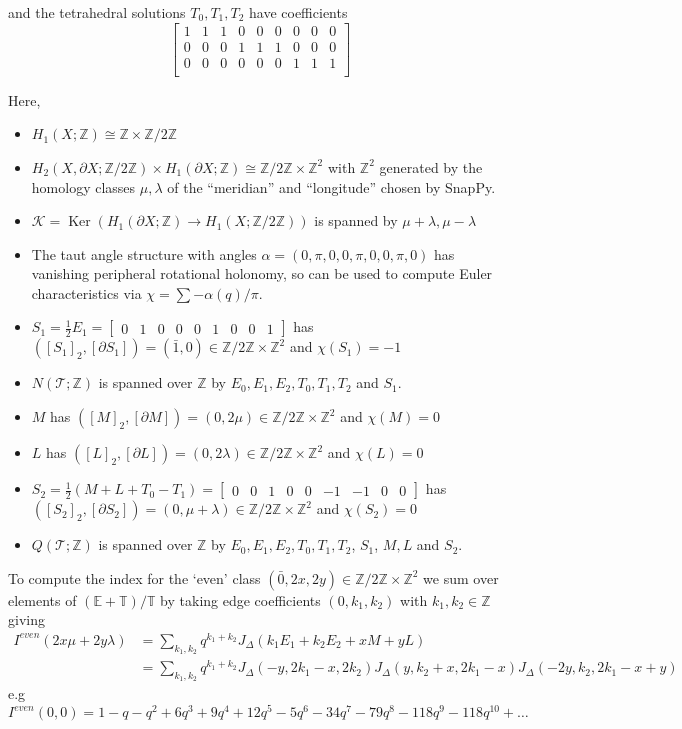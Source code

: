 \documentclass[12pt,reqno]{amsart}  %
\theoremstyle{definition}
\theoremstyle{remark}
\def\E{\mathbb{E}}
\newcommand{\TT}{\mathbb{T}}
\newcommand{\T}{\mathcal{T}}
\def\Z{\mathbb Z}
\def\JD{J_{\Delta}}
\def\bd{\partial}
\DeclareMathOperator{\Ker}{Ker}
\def\TT{\mathbb T}   %
\begin{document}
and the tetrahedral solutions $T_0,T_1,T_2$ have coefficients
$$
\begin{bmatrix} 
1 & 1 & 1 & 0 & 0 & 0 & 0 & 0 & 0\\
0 & 0 & 0 & 1 & 1 & 1 &  0 & 0 & 0\\
0 & 0 & 0 & 0 & 0 & 0 & 1 & 1 & 1\\
\end{bmatrix}
$$

Here,
\begin{itemize}
\item 
$H_1(X;\Z) \cong \Z \times \Z/2\Z$
\item 
$H_2(X,\bd X;\Z/2\Z) \times H_1(\bd X;\Z)  \cong \Z/2\Z \times \Z^2$ with 
$\Z^2$ generated by the 
homology classes $\mu,\lambda$ of the ``meridian'' and ``longitude'' chosen 
by SnapPy.
\item 
${\mathcal K} = \Ker\left(H_1(\bd X; \Z) \to H_1(X;\Z/2\Z)\right)$ is 
spanned by $\mu+\lambda,\mu-\lambda$
\item 
The taut angle structure with angles $\alpha=(0,\pi,0,0,\pi,0,0,\pi,0)$ has 
vanishing peripheral rotational holonomy, 
so can be used to compute Euler characteristics via 
$\chi = \sum -\alpha(q)/\pi$. 
\item 
$S_1= \frac{1}{2} E_1 = 
\begin{bmatrix} 0 & 1 & 0 & 0 & 0 & 1 &  0 & 0 & 1\end{bmatrix}$ has
$([S_1]_2,[\bd S_1]) = (\bar 1, 0 ) \in \Z/2\Z \times \Z^2$ and $\chi(S_1)=-1$
\item 
$N(\T;\Z)$ is spanned over $\Z$ by $E_0,E_1,E_2,T_0,T_1,T_2$ and $S_1$.
\item
$M$ has $([M]_2,[\bd M]) = (0, 2\mu ) \in \Z/2\Z \times \Z^2$ and $\chi(M)=0$
\item
$L$ has $([L]_2,[\bd L]) = (0, 2\lambda ) \in \Z/2\Z \times \Z^2$ and 
$\chi(L)=0$
\item
$S_2 = \frac{1}{2}(M+L+T_0-T_1) = 
\begin{bmatrix} 0 & 0 & 1 & 0 & 0 & -1 &  -1 & 0 & 0\end{bmatrix}$ has
$([S_2]_2,[\bd S_2]) = (0, \mu+\lambda ) \in \Z/2\Z \times \Z^2$ and 
$\chi(S_2)= 0$
\item
$Q(\T;\Z)$ is spanned over $\Z$ by $E_0,E_1,E_2,T_0,T_1,T_2$, $S_1$, $M,L$ 
and $S_2$.
\end{itemize}

To compute the index for the `even' class 
$(\bar 0,2x,2y) \in \Z/2\Z \times \Z^2$ we sum over elements of $(\E+\TT)/\TT$ 
by taking edge coefficients $(0,k_1,k_2)$ with  $k_1,k_2 \in \Z$ giving
\begin{align*}
I^{even}(2x\mu+2y\lambda) &= \sum_{k_1,k_2} q^{k_1+k_2} \JD(k_1E_1+k_2E_2+xM+yL) \\
& = \sum_{k_1,k_2}  q^{k_1+k_2}
\JD(-y,2k_1-x,2k_2)\JD(y,k_2+x,2k_1-x)\JD(-2y,k_2,2k_1-x+y)
\end{align*}
e.g
$$
I^{even}(0,0)=1-q-q^2+6 q^3+9 q^4+12 q^5-5 q^6-34 q^7-79 q^8-118 q^9
-118 q^{10}+ \ldots
$$
\end{document}

